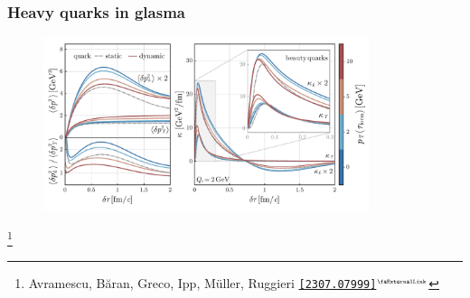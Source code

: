 \documentclass[aspectratio=169,11pt,usenames,dvipsnames]{beamer}
\renewcommand{\thefootnote}{\color{customblue}\faPaperPlaneO}
\newcommand\blfootnote[1]{%
  \begingroup
  \renewcommand\thefootnote{}\footnote{#1}%
  \addtocounter{footnote}{-1}%
  \endgroup
}
\begin{document}
    


\begin{frame}
    \frametitle{Heavy quarks in glasma}
    \begin{center}
        \begin{figure}
            \centering
            \includegraphics[width=0.85\textwidth]{images/hp23_mom_broad_kappa_anis_wong_vs_kappa.pdf}
        \end{figure}
    \end{center}
    \vspace{-20pt}
    \blfootnote{\scriptsize Avramescu, Băran, Greco, Ipp, Müller, Ruggieri  \href{https://arxiv.org/abs/2307.07999}{{\color{palgold}\texttt{[2307.07999]}$^\text{\tiny\faExternalLink}$}}}
\end{frame}

\end{document}
